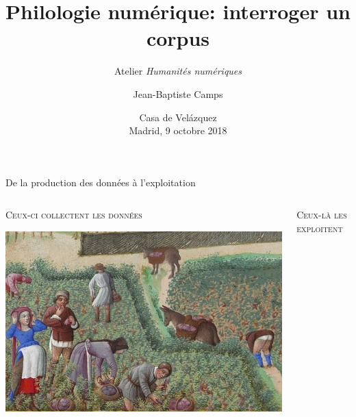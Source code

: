 \documentclass{beamer}
\institute{École nationale des chartes | Paris, Sciences \& Lettres}
\title{Philologie numérique: interroger un corpus}
\subtitle{Atelier \textit{Humanités numériques}}
\author{Jean-Baptiste Camps}
\date[Madrid, 9 oct. 2018]{Casa de Velázquez\\ Madrid, 9 octobre 2018}
\begin{document}
\maketitle
  

\begin{frame}{De la production des données à l'exploitation}
	
	\begin{columns}[T]
		
		\begin{column}{0.62\textwidth}
			
			\textsc{Ceux-ci collectent les données}
			
			\centering
			
			\includegraphics[width=\textwidth]{img/vendange.jpg}
			
		\end{column}
			\begin{column}{0.38\textwidth}
		
		\textsc{Ceux-là les exploitent}
		
		\centering
		

\end{column}
\end{columns}
\end{frame}
\end{document}
